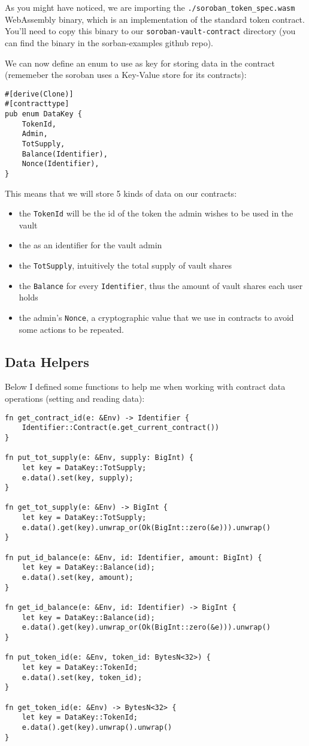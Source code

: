 \documentclass{article}
\newcommand{\inl}[1]{\lstinline{#1}}
\begin{document}
As you might have noticed, we are importing the \inl{./soroban_token_spec.wasm} WebAssembly binary, which is an implementation of the standard token contract. You'll need to copy this binary to our \inl{soroban-vault-contract} directory (you can find the binary in the sorban-examples github repo).

We can now define an enum to use as key for storing data in the contract (rememeber the soroban uses a Key-Value store for its contracts):

\begin{lstlisting}
#[derive(Clone)]
#[contracttype]
pub enum DataKey {
    TokenId,
    Admin,
    TotSupply,
    Balance(Identifier),
    Nonce(Identifier),
}
\end{lstlisting}

This means that we will store 5 kinds of data on our contracts:

\begin{itemize}
\item the \inl{TokenId} will be the id of the token the admin wishes to be used in the vault
\item the  as an identifier for the vault admin
\item the \inl{TotSupply}, intuitively the total supply of vault shares
\item the \inl{Balance} for every \inl{Identifier}, thus the amount of vault shares each user holds
\item the admin's \inl{Nonce}, a cryptographic value that we use in contracts to avoid some actions to be repeated.
\end{itemize}


\subsection{Data Helpers}
Below I defined some functions to help me when working with contract data operations (setting and reading data):

\begin{lstlisting}
fn get_contract_id(e: &Env) -> Identifier {
    Identifier::Contract(e.get_current_contract())
}

fn put_tot_supply(e: &Env, supply: BigInt) {
    let key = DataKey::TotSupply;
    e.data().set(key, supply);
}

fn get_tot_supply(e: &Env) -> BigInt {
    let key = DataKey::TotSupply;
    e.data().get(key).unwrap_or(Ok(BigInt::zero(&e))).unwrap()
}

fn put_id_balance(e: &Env, id: Identifier, amount: BigInt) {
    let key = DataKey::Balance(id);
    e.data().set(key, amount);
}

fn get_id_balance(e: &Env, id: Identifier) -> BigInt {
    let key = DataKey::Balance(id);
    e.data().get(key).unwrap_or(Ok(BigInt::zero(&e))).unwrap()
}

fn put_token_id(e: &Env, token_id: BytesN<32>) {
    let key = DataKey::TokenId;
    e.data().set(key, token_id);
}

fn get_token_id(e: &Env) -> BytesN<32> {
    let key = DataKey::TokenId;
    e.data().get(key).unwrap().unwrap()
}
\end{lstlisting}
\end{document}
